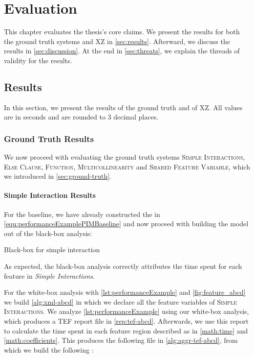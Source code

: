 \chapter{Evaluation}\label{ch:evaluation}
\lstset{style=myStyle}

This chapter evaluates the thesis's core claims.  
We present the results for both the ground truth systems and \textsc{XZ} in \autoref{sec:results}.
Afterward, we discuss the results in \autoref{sec:discussion}. At the end in \autoref{sec:threats}, we explain the threads of validity for the results.

\section{Results}\label{sec:results}

In this section, we present the results of the ground truth and of \textsc{XZ}. 
All values are in seconds and are rounded to 3 decimal places.


\subsection*{Ground Truth Results}
We now proceed with evaluating the ground truth systems \textsc{Simple Interactions}, \textsc{Else Clause}, \textsc{Function}, \textsc{Multicollinearity} 
and \textsc{Shared Feature Variable}, which we introduced in \autoref{sec:ground-truth}.

\subsubsection*{Simple Interaction Results}

For the baseline, we have already constructed the {\perfInfluenceModel} in 
\autoref{equ:performanceExamplePIMBaseline} and now proceed with building the model out of the black-box analysis:

\begin{table}[H]
    \centering
    
    \caption{Black-box {\perfInfluenceModel} for simple interaction}
\end{table}

As expected, the black-box analysis correctly attributes the time spent for each feature in \emph{Simple Interactions}.

 
For the white-box analysis with \autoref{lst:performanceExample} and \autoref{fig:feature_abcd} we build \autoref{alg:xml-abcd} 
in which we declare all the feature variables of \textsc{Simple Interactions}. 
We analyze \autoref{lst:performanceExample} using our white-box analysis, which produces a TEF report file in \autoref{rep:tef-abcd}. 
Afterwards, we use this report to calculate the time spent in each feature region described as in \autoref{math:time} 
and \autoref{math:coefficients}. This produces the following file in \autoref{alg:aggr-tef-abcd},
from which we build the following {\perfInfluenceModel}:

